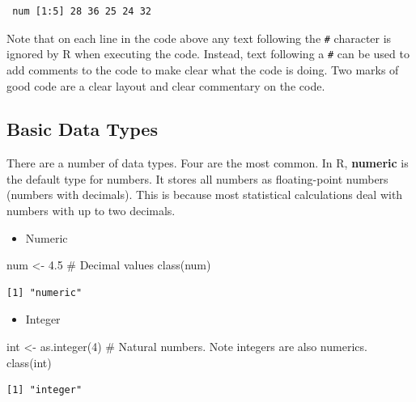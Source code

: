 \documentclass[
  letterpaper,
  DIV=11,
  numbers=noendperiod,
  oneside]{scrreprt}
\newenvironment{Shaded}{\begin{snugshade}}{\end{snugshade}}
\newcommand{\CommentTok}[1]{\textcolor[rgb]{0.37,0.37,0.37}{#1}}
\newcommand{\DecValTok}[1]{\textcolor[rgb]{0.68,0.00,0.00}{#1}}
\newcommand{\FloatTok}[1]{\textcolor[rgb]{0.68,0.00,0.00}{#1}}
\newcommand{\FunctionTok}[1]{\textcolor[rgb]{0.28,0.35,0.67}{#1}}
\newcommand{\NormalTok}[1]{\textcolor[rgb]{0.00,0.23,0.31}{#1}}
\newcommand{\OtherTok}[1]{\textcolor[rgb]{0.00,0.23,0.31}{#1}}
\providecommand{\tightlist}{%
  \setlength{\itemsep}{0pt}\setlength{\parskip}{0pt}}\usepackage{longtable,booktabs,array}
\begin{document}
\begin{verbatim}
 num [1:5] 28 36 25 24 32
\end{verbatim}

Note that on each line in the code above any text following the
\texttt{\#} character is ignored by R when executing the code. Instead,
text following a \texttt{\#} can be used to add comments to the code to
make clear what the code is doing. Two marks of good code are a clear
layout and clear commentary on the code.

\subsection{Basic Data Types}\label{basic-data-types}

There are a number of data types. Four are the most common. In R,
\textbf{numeric} is the default type for numbers. It stores all numbers
as floating-point numbers (numbers with decimals). This is because most
statistical calculations deal with numbers with up to two decimals.

\begin{itemize}
\tightlist
\item
  Numeric
\end{itemize}

\begin{Shaded}
\begin{Highlighting}[]
\NormalTok{num }\OtherTok{\textless{}{-}} \FloatTok{4.5} \CommentTok{\# Decimal values}
\FunctionTok{class}\NormalTok{(num)}
\end{Highlighting}
\end{Shaded}

\begin{verbatim}
[1] "numeric"
\end{verbatim}

\begin{itemize}
\tightlist
\item
  Integer
\end{itemize}

\begin{Shaded}
\begin{Highlighting}[]
\NormalTok{int }\OtherTok{\textless{}{-}} \FunctionTok{as.integer}\NormalTok{(}\DecValTok{4}\NormalTok{) }\CommentTok{\# Natural numbers. Note integers are also numerics.}
\FunctionTok{class}\NormalTok{(int)}
\end{Highlighting}
\end{Shaded}

\begin{verbatim}
[1] "integer"
\end{verbatim}
\end{document}
